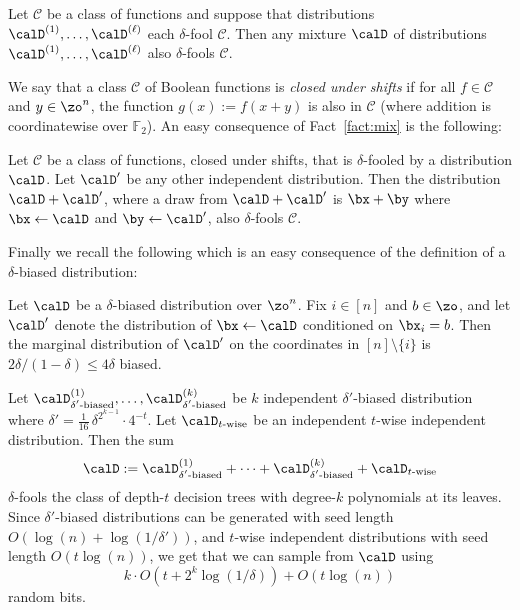 \documentclass{toc}
\theoremstyle{plain}
\renewcommand{\F}{\mathds{F}}
\begin{document}
\begin{fact} \label{fact:mix}
Let $\mathscr{C}$ be a class of functions and suppose that distributions $\calD^{(1)},\dots,\calD^{(\ell)}$ each $\delta$-fool $\mathscr{C}.$
Then any mixture $\calD$ of distributions $\calD^{(1)},\dots,\calD^{(\ell)}$ also $\delta$-fools $\mathscr{C}.$
\end{fact}


We say that a class $\mathscr{C}$ of Boolean functions is \emph{closed under shifts} if for all $f \in \mathscr{C}$ and $y \in \zo^n$, the function $g(x) := f(x + y)$ is also in $\mathscr{C}$ (where addition is %
coordinatewise    %
over $\F_2$).
An easy consequence of Fact~\ref{fact:mix} is the following:

\begin{fact}
\label{fact:more-is-better} 
Let $\mathscr{C}$ be a class of functions, closed under shifts, that is $\delta$-fooled by a distribution $\calD$. Let $\calD'$ be any other independent distribution. Then the distribution $\calD + \calD'$, where a draw from $\calD + \calD'$ is $\bx + \by$ where $\bx \leftarrow \calD$ and $\by\leftarrow\calD'$, also $\delta$-fools $\mathscr{C}$. 
\end{fact} 

Finally we recall the following which is an easy consequence of the definition of a $\delta$-biased distribution:
\begin{fact}
\label{fact:conditioning}
Let $\calD$ be a $\delta$-biased distribution over $\zo^n$. Fix $i\in [n]$ and $b \in \zo$, and let $\calD'$ denote the distribution of $\bx\leftarrow\calD$ conditioned on $\bx_i = b$.  Then the marginal distribution of $\calD'$ on the coordinates in $[n] \setminus \{i\}$ is $2\delta/(1-\delta) \le 4\delta$ biased.%
\end{fact} 



\begin{lemma} 
\label{lem:fool-simple}
Let $\calD^{(1)}_{\text{$\delta'$-biased}},\ldots,\calD^{(k)}_{\text{$\delta'$-biased}}$ be $k$ independent $\delta'$-biased distribution where $\delta' = \frac1{16}\,\delta^{2^{k-1}} \cdot 4^{-t}$. Let $\calD_{\text{$t$-wise}}$ be an independent $t$-wise independent distribution.  Then the sum 
\[ \calD := \calD^{(1)}_{\text{$\delta'$-biased}} + \cdots + \calD^{(k)}_{\text{$\delta'$-biased}} + \calD_{\text{$t$-wise}} \]
$\delta$-fools the class of depth-$t$ decision trees with degree-$k$ polynomials at its leaves.  Since $\delta'$-biased distributions can be generated with seed length $O(\log(n) + \log(1/\delta'))$, and $t$-wise independent distributions with seed length $O(t \log(n))$, we get that we can sample from $\calD$ using 
\[ k \cdot O(t + 2^k\log(1/\delta)) + O(t \log(n)) \] 
random bits. 
\end{lemma} 
\end{document}
